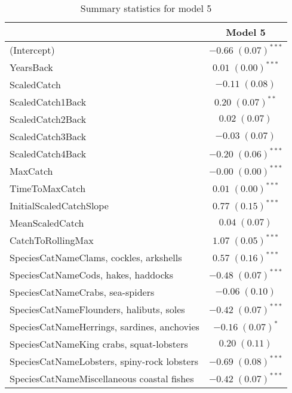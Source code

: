 \documentclass[]{article}
\begin{document}
\begin{table}[h]
\caption{Summary statistics for model 5}
\begin{center}
\begin{tabular}{l c }
\hline
                                              & Model 5 \\
\hline
(Intercept)                                   & $-0.66 \; (0.07)^{***}$ \\
YearsBack                                     & $0.01 \; (0.00)^{***}$  \\
ScaledCatch                                   & $-0.11 \; (0.08)$       \\
ScaledCatch1Back                              & $0.20 \; (0.07)^{**}$   \\
ScaledCatch2Back                              & $0.02 \; (0.07)$        \\
ScaledCatch3Back                              & $-0.03 \; (0.07)$       \\
ScaledCatch4Back                              & $-0.20 \; (0.06)^{***}$ \\
MaxCatch                                      & $-0.00 \; (0.00)^{***}$ \\
TimeToMaxCatch                                & $0.01 \; (0.00)^{***}$  \\
InitialScaledCatchSlope                       & $0.77 \; (0.15)^{***}$  \\
MeanScaledCatch                               & $0.04 \; (0.07)$        \\
CatchToRollingMax                             & $1.07 \; (0.05)^{***}$  \\
SpeciesCatNameClams, cockles, arkshells       & $0.57 \; (0.16)^{***}$  \\
SpeciesCatNameCods, hakes, haddocks           & $-0.48 \; (0.07)^{***}$ \\
SpeciesCatNameCrabs, sea-spiders              & $-0.06 \; (0.10)$       \\
SpeciesCatNameFlounders, halibuts, soles      & $-0.42 \; (0.07)^{***}$ \\
SpeciesCatNameHerrings, sardines, anchovies   & $-0.16 \; (0.07)^{*}$   \\
SpeciesCatNameKing crabs, squat-lobsters      & $0.20 \; (0.11)$        \\
SpeciesCatNameLobsters, spiny-rock lobsters   & $-0.69 \; (0.08)^{***}$ \\
SpeciesCatNameMiscellaneous coastal fishes    & $-0.42 \; (0.07)^{***}$ \\

\end{tabular}
\end{center}
\end{table}
\end{document}
